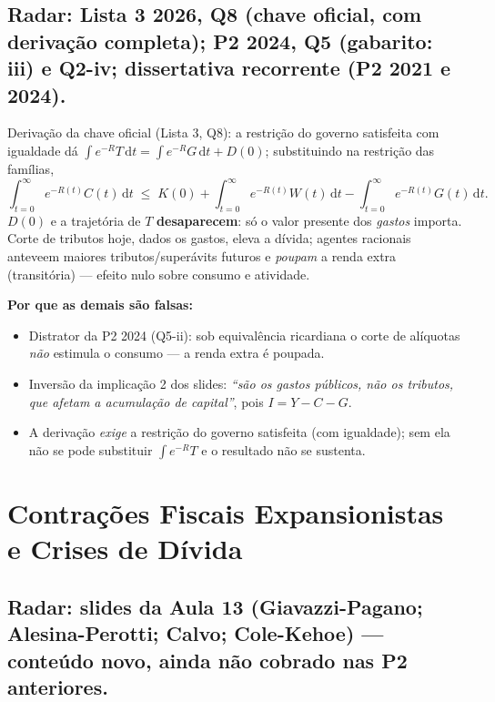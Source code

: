 \documentclass[12pt, a4paper]{article}
\newcommand{\dif}{\mathrm{d}}
\begin{document}
\subsection{Radar: Lista 3 2026, Q8 (chave oficial, com derivação completa); P2 2024, Q5 (gabarito: iii) e Q2-iv; dissertativa recorrente (P2 2021 e 2024).}

\begin{correctbox}[title={Resposta correta: d)}]
Derivação da chave oficial (Lista 3, Q8): a restrição do governo satisfeita com
igualdade dá
$\int e^{-R}T\,\dif t = \int e^{-R}G\,\dif t + D(0)$;
substituindo na restrição das famílias,
\[
\int_{t=0}^{\infty} e^{-R(t)} C(t)\,\dif t \;\leq\;
K(0) + \int_{t=0}^{\infty} e^{-R(t)} W(t)\,\dif t
- \int_{t=0}^{\infty} e^{-R(t)} G(t)\,\dif t.
\]
$D(0)$ e a trajetória de $T$ \textbf{desaparecem}: só o valor presente dos
\emph{gastos} importa. Corte de tributos hoje, dados os gastos, eleva a dívida;
agentes racionais anteveem maiores tributos/superávits futuros e \emph{poupam}
a renda extra (transitória) --- efeito nulo sobre consumo e atividade.
\checkmark

\textbf{Por que as demais são falsas:}
\begin{itemize}[leftmargin=*]
\item[a)] Distrator da P2 2024 (Q5-ii): sob equivalência ricardiana o corte de
alíquotas \emph{não} estimula o consumo --- a renda extra é poupada.
\item[b)] Inversão da implicação 2 dos slides: \emph{``são os gastos públicos,
não os tributos, que afetam a acumulação de capital''}, pois
$I = Y - C - G$.
\item[c)] A derivação \emph{exige} a restrição do governo satisfeita (com
igualdade); sem ela não se pode substituir $\int e^{-R}T$ e o resultado não se
sustenta.
\end{itemize}
\end{correctbox}

\section{Contrações Fiscais Expansionistas e Crises de Dívida}

\subsection{Radar: slides da Aula 13 (Giavazzi-Pagano; Alesina-Perotti; Calvo; Cole-Kehoe) --- conteúdo novo, ainda não cobrado nas P2 anteriores.}
\end{document}
